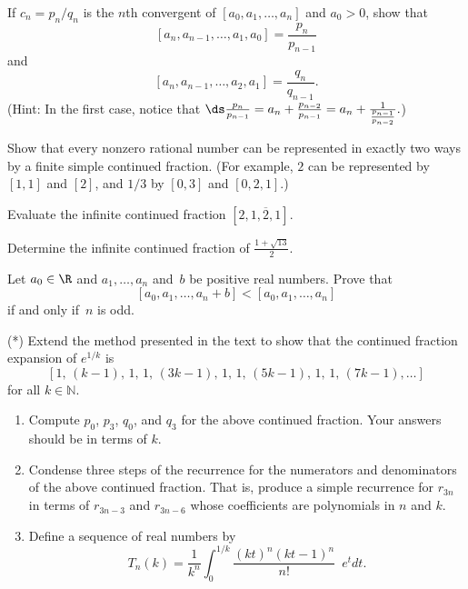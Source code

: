 \begin{exercises}

\item\label{ex:cf2}
If $c_n=p_n/q_n$ is the $n$th convergent of
$[a_0,a_1,\ldots,a_n]$ and $a_0>0$, show that
$$
  [a_n,a_{n-1},\ldots, a_1, a_0] = \frac{p_n}{p_{n-1}}
$$
and
$$
   [a_n,a_{n-1},\ldots, a_2, a_1] = \frac{q_n}{q_{n-1}}.
$$
(Hint: In the first case, notice that
$\ds \frac{p_n}{p_{n-1}} = a_n + \frac{p_{n-2}}{p_{n-1}}
          = a_n + \frac{1}{\frac{p_{n-1}}{p_{n-2}}}.$)

\item\label{ex:cf3b}
Show that every nonzero rational number can be represented in
exactly two ways by a finite simple continued fraction.  (For
example, $2$ can be represented by $[1,1]$ and $[2]$, and $1/3$
by $[0,3]$ and $[0,2,1]$.)

\item\label{ex:cf4}
Evaluate the infinite continued fraction $[2,\overline{1,2,1}]$.

\item\label{ex:cf5}
Determine the infinite continued fraction of $\frac{1+\sqrt{13}}{2}$.

\item Let $a_0\in\R$ and $a_1,\ldots,a_n$ and~$b$ be positive
real numbers.  Prove that
$$
  [a_0,a_1,\ldots,a_n+b] < [a_0,a_1,\ldots,a_n]
$$
if and only if~$n$ is odd.



\item (*) \label{ex:contfrac_epow} Extend the method presented in the text
to show that the continued fraction expansion of $e^{1/k}$ is
$$
  [1,\,(k-1),\,1,\,1,\,(3k-1),\,1,\,1,\,(5k-1),\,1,\,1,\,(7k-1),\ldots]
$$
for all $k \in
\mathbb{N}$.

\begin{enumerate}
\item
Compute $p_0$, $p_3$, $q_0$, and $q_3$ for the above continued fraction. Your answers should be in terms of $k$.

\item\label{condense}
Condense three steps of the recurrence for the numerators and denominators of the above continued fraction. That is, produce a simple recurrence for $r_{3n}$ in terms of $r_{3n-3}$ and $r_{3n-6}$ whose coefficients are polynomials in $n$ and $k$.

\item
Define a sequence of real numbers by
$$T_n(k)=\frac{1}{k^n}\int_{0}^{1/k}\frac{(kt)^{n}(kt-1)^{n}}{n!}\phantom{1} e^tdt.$$


\end{enumerate}
\end{exercises}
